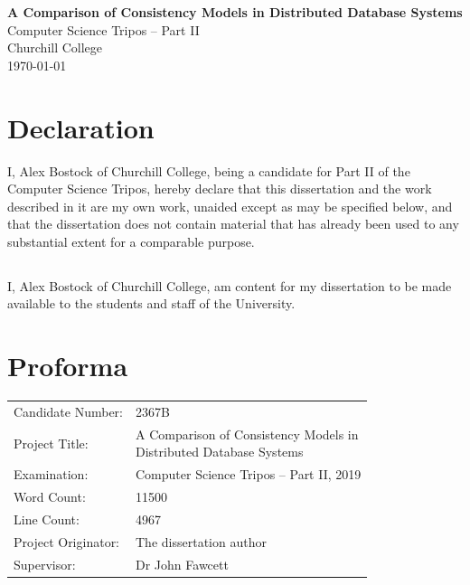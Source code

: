 \documentclass[12pt,a4paper,twoside,openany]{report}
\begin{document}





\pagestyle{empty}


\vspace*{60mm}
\begin{center}
\Huge
\textbf{A Comparison of Consistency Models in Distributed Database Systems} \\[5mm]
Computer Science Tripos -- Part II \\[5mm]
Churchill College \\[5mm]
\today  %
\end{center}


\pagestyle{plain}


\chapter*{Declaration}

I, Alex Bostock of Churchill College,
being a candidate for Part II of the Computer Science Tripos,
hereby declare that this dissertation and the work described in it
are my own work, unaided except as may be specified below, and
that the dissertation does not contain material that has already
been used to any substantial extent for a comparable purpose.

\section*{}

I, Alex Bostock of Churchill College,
am content for my dissertation to be made available to the students and staff of the University. 

\chapter*{Proforma}

{\large
\begin{tabular}{ll}
Candidate Number:   & 2367B \\
Project Title:      & \makecell[tl]{A Comparison of Consistency Models in \\ Distributed Database Systems}\\
Examination:        & Computer Science Tripos -- Part II, 2019  \\
Word Count:         & 11500 \\ %
Line Count:         & 4967 \\
Project Originator: & The dissertation author \\
Supervisor:         & Dr John Fawcett                    \\ 
\end{tabular}
}
\end{document}
